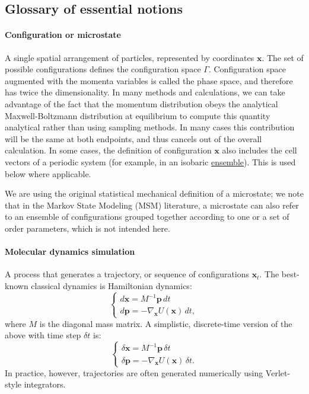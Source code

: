 \documentclass[9pt,review]{livecoms}
\newcommand{\vx}{\mathbf{x}}
\newcommand{\vp}{\mathbf{p}}
\begin{document}
\subsection{Glossary of essential notions}
\label{sec:glossary}

\hypertarget{ref:Microstate} {\paragraph{Configuration or microstate}}
A single spatial arrangement of particles, represented by coordinates $\vx$. The set of possible configurations defines the configuration space $\Gamma$.
Configuration space augmented with the momenta variables is called the phase space, and therefore has twice the dimensionality. In many methods and calculations, we can take advantage of the fact that the momentum distribution obeys the analytical Maxwell-Boltzmann distribution at equilibrium to compute this quantity analytical rather than using sampling methods.  In many cases this contribution will be the same at both endpoints, and thus cancels out of the overall calculation.
In some cases, the  definition of configuration $\vx$ also includes the cell vectors of a periodic system (for example, in an isobaric \hyperlink{ref:Ensemble} {ensemble}).  This is used below where applicable.

We are using the original statistical mechanical definition of a microstate; we note that in the Markov State Modeling (MSM) literature, a microstate can also refer to an ensemble of configurations grouped together according to one or a set of order parameters, which is not intended here.

\hypertarget{ref:MolecularDynamics}{\paragraph{Molecular dynamics simulation}}
A process that generates a trajectory, or sequence of configurations $\vx_t$.
The best-known classical dynamics is Hamiltonian dynamics:
\begin{equation}
\left\{
\begin{array}{ll}
    d\vx = M^{-1} \vp \,  dt \\
    d\vp = -\nabla_\vx U(\vx) \, dt,
\end{array}
\right.
    \label{eq:md}
\end{equation}
where $M$ is the diagonal mass matrix.
A simplistic, discrete-time version of the above with time step $\delta t$ is:
\begin{equation}
\left\{
\begin{array}{ll}
    \delta \vx = M^{-1} \vp \, \delta t \\
    \delta \vp = -\nabla_\vx U(\vx) \, \delta t.
    \label{eq:md_discrete}
\end{array}
\right.
\end{equation}
In practice, however, trajectories are often generated numerically using Verlet-style integrators.
\end{document}

